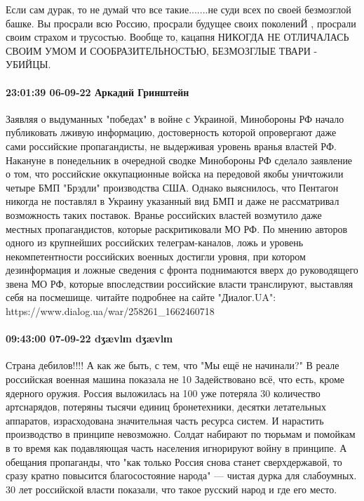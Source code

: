 Если сам дурак, то не думай что все такие.......не суди всех по своей
безмозглой башке. Вы просрали всю Россию, просрали будущее своих поколениЙ ,
просрали своим страхом и трусостью. Вообще то, кацапня НИКОГДА НЕ ОТЛИЧАЛАСЬ
СВОИМ УМОМ И СООБРАЗИТЕЛЬНОСТЬЮ, БЕЗМОЗГЛЫЕ ТВАРИ - УБИЙЦЫ.

\paragraph{23:01:39 06-09-22 Аркадий Гринштейн}

Заявляя о выдуманных
"победах" в войне с Украиной, Минобороны РФ начало публиковать лживую
информацию, достоверность которой опровергают даже сами российские
пропагандисты, не выдерживая уровень вранья властей РФ. Накануне в
понедельник в очередной сводке Минобороны РФ сделало заявление о том,
что российские оккупационные войска на передовой якобы уничтожили четыре
БМП "Брэдли" производства США.
Однако выяснилось, что Пентагон никогда не поставлял в Украину указанный
вид БМП и даже не рассматривал возможность таких поставок.
Вранье российских властей возмутило даже местных пропагандистов, которые
раскритиковали МО РФ. По мнению авторов одного из крупнейших российских
телеграм-каналов, ложь и уровень некомпетентности российских военных
достигли уровня, при котором дезинформация и ложные сведения с фронта
поднимаются вверх до руководящего звена МО РФ, которые впоследствии
российские власти транслируют, выставляя себя на посмешище.
читайте подробнее на сайте "Диалог.UA": https://www.dialog.ua/war/258261_1662460718

\paragraph{09:43:00 07-09-22 dʒævlɪn dʒævlɪn}

Страна дебилов!!!! А как же быть, с тем, что "Мы ещё не начинали?" В реале
российская военная машина показала не 10%
Задействовано всё, что есть, кроме ядерного оружия. Россия выложилась на 100%
уже потеряла 30%
количество артснарядов, потеряны тысячи единиц бронетехники, десятки
летательных аппаратов, израсходована значительная часть ресурса систем. И
нарастить производство в принципе невозможно. Солдат набирают по тюрьмам и
помойкам в то время как подавляющая часть населения игнорируют войну в
принципе. А обещания пропаганды, что "как только Россия снова станет
сверхдержавой, то сразу кратно повысится благосостояние народа" — чистая дурка
для слабоумных. 30 лет российской власти показали, что такое русский народ и
где его место.

